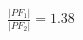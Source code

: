 \documentclass[preview]{standalone}
\begin{document}
\begin{align*}
\frac{|PF_1|}{|PF_2|} = 1.38
\end{align*}
\end{document}

